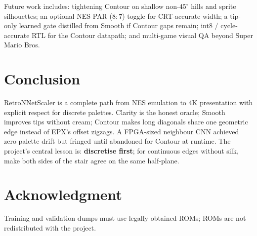 \documentclass[conference]{IEEEtran}
\begin{document}
Future work includes: tightening Contour on shallow non-$45^\circ$ hills and
sprite silhouettes; an optional NES PAR ($8{:}7$) toggle for CRT-accurate
width; a tip-only learned gate distilled from Smooth if Contour gaps remain;
int8 / cycle-accurate RTL for the Contour datapath; and multi-game visual QA
beyond Super Mario Bros.

\section{Conclusion}
\label{sec:conclusion}

RetroNNetScaler is a complete path from NES emulation to 4K presentation with
explicit respect for discrete palettes. Clarity is the honest oracle; Smooth
improves tips without cream; Contour makes long diagonals share one geometric
edge instead of EPX's offset zigzags. A FPGA-sized neighbour CNN achieved zero
palette drift but fringed until abandoned for Contour at runtime. The project's
central lesson is: \textbf{discretise first}; for continuous edges without
silk, make both sides of the stair agree on the same half-plane.

\section*{Acknowledgment}
Training and validation dumps must use legally obtained ROMs; ROMs are not
redistributed with the project.



\end{document}
